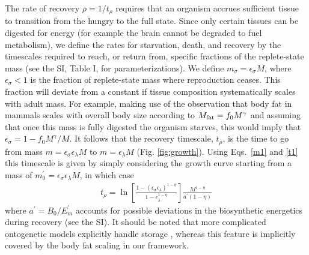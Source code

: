 \documentclass[twocolumn,preprintnumbers,amsmath,amssymb,superscriptaddress]{revtex4}
\begin{document}
{The rate of recovery $\rho = 1/t_\rho$ requires that an organism accrues
sufficient tissue to transition from the hungry to the full state.  Since
only certain tissues can be digested for energy (for example the brain cannot
be degraded to fuel metabolism), we define the rates for starvation, death,
and recovery by the timescales required to reach, or return from, specific
fractions of the replete-state mass (see the SI, Table I, for
parameterizations).  We define $m_{\sigma}=\epsilon_{\sigma} M$, where
$\epsilon_{\sigma}<1$ is the fraction of replete-state mass where
reproduction ceases. This fraction will deviate from a constant if tissue
composition systematically scales with adult mass.  For example, making use
of the observation that body fat in mammals scales with overall body size
according to $M_{\rm fat}=f_{0}M^{\gamma}$ and assuming that once this mass
is fully digested the organism starves, this would imply that
$\epsilon_{\sigma}=1-f_{0}M^{\gamma}/M$. It follows that the recovery
timescale, $t_{\rho}$, is the time to go from mass
$m=\epsilon_{\sigma} \epsilon_{\lambda} M$ to $m=\epsilon_{\lambda}M$
(Fig. \ref{fig:growth}). Using Eqs.~\eqref{m1} and \eqref{t1} this timescale
is given by simply considering the growth curve starting from a mass of
$m_{0}^{\prime}=\epsilon_{\sigma}\epsilon_{\lambda}M$, in which case
\begin{eqnarray}
\label{rhotimescale}
t_{\rho}=\ln\left[\frac{1-\left(\epsilon_{\sigma}\epsilon_{\lambda}\right)^{1-\eta}}{1-\epsilon_\lambda^{1-\eta}}\right]\frac{M^{1-\eta}}{a^{\prime}\left(1-\eta\right)}
\end{eqnarray}
where $a^{\prime}=B_{0}/E_{m}^{\prime}$ accounts for possible deviations in
the biosynthetic energetics during recovery (see the SI). It should be noted that more complicated ontogenetic models explicitly handle
storage \citep{hou}, whereas this feature is implicitly covered by the body
fat scaling in our framework.



}
\end{document}
